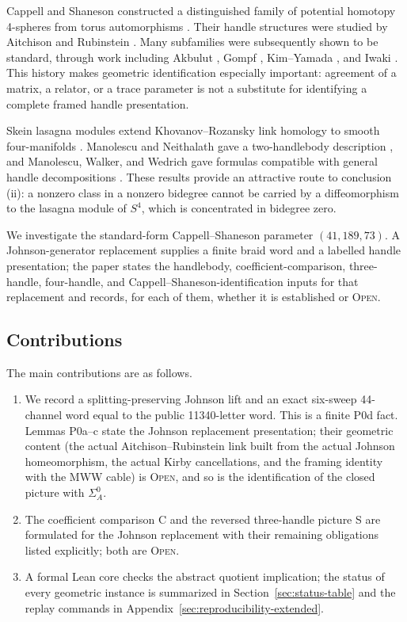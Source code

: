 \documentclass[11pt]{amsart}
\theoremstyle{definition}
\theoremstyle{remark}
\newcommand{\Open}{\textnormal{\textsc{Open}}}
\begin{document}
Cappell and Shaneson constructed a distinguished family of potential
homotopy 4-spheres from torus automorphisms \cite{CappellShaneson1976}.
Their handle structures were studied by Aitchison and Rubinstein
\cite{AitchisonRubinstein1984}.  Many subfamilies were subsequently shown to
be standard, through work including Akbulut \cite{Akbulut2010}, Gompf
\cite{Gompf2010}, Kim--Yamada \cite{KimYamada2017}, and Iwaki
\cite{Iwaki2024}.  This history makes geometric identification especially
important: agreement of a matrix, a relator, or a trace parameter is not a
substitute for identifying a complete framed handle presentation.

Skein lasagna modules extend Khovanov--Rozansky link homology to smooth
four-manifolds \cite{MorrisonWalkerWedrich2019}.  Manolescu and Neithalath
gave a two-handlebody description \cite{ManolescuNeithalath2020}, and
Manolescu, Walker, and Wedrich gave formulas compatible with general handle
decompositions \cite{ManolescuWalkerWedrich2023}.  These results provide an
attractive route to conclusion (ii): a nonzero class in a nonzero bidegree
cannot be carried by a diffeomorphism to the lasagna module of $S^4$, which
is concentrated in bidegree zero.

We investigate the standard-form Cappell--Shaneson parameter
$(41,189,73)$.  A Johnson-generator replacement supplies a finite braid word
and a labelled handle presentation; the paper states the handlebody,
coefficient-comparison, three-handle, four-handle, and
Cappell--Shaneson-identification inputs for that replacement and records,
for each of them, whether it is established or \Open.

\subsection*{Contributions}

The main contributions are as follows.
\begin{enumerate}
\item We record a splitting-preserving Johnson lift and an exact
six-sweep 44-channel word equal to the public 11340-letter word.  This is a
finite P0d fact.  Lemmas P0a--c state the Johnson replacement presentation;
their geometric content (the actual Aitchison--Rubinstein link built from
the actual Johnson homeomorphism, the actual Kirby cancellations, and the
framing identity with the MWW cable) is \Open, and so is the identification
of the closed picture with \(\Sigma_A^0\).
\item The coefficient comparison C and the reversed three-handle picture S
are formulated for the Johnson replacement with their remaining obligations
listed explicitly; both are \Open.
\item A formal Lean core checks the abstract quotient implication; the
status of every geometric instance is summarized in
Section~\ref{sec:status-table} and the replay commands in
Appendix~\ref{sec:reproducibility-extended}.
\end{enumerate}
\end{document}
